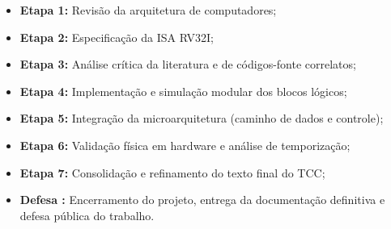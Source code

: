 \begin{itemize}
    \item \textbf{Etapa 1:} Revisão da arquitetura de computadores;
    \item \textbf{Etapa 2:} Especificação da ISA RV32I;
    \item \textbf{Etapa 3:} Análise crítica da literatura e de códigos-fonte correlatos;
    \item \textbf{Etapa 4:} Implementação e simulação modular dos blocos lógicos;
    \item \textbf{Etapa 5:} Integração da microarquitetura (caminho de dados e controle);
    \item \textbf{Etapa 6:} Validação física em hardware e análise de temporização;
    \item \textbf{Etapa 7:} Consolidação e refinamento do texto final do TCC;
    \item \textbf{Defesa :} Encerramento do projeto, entrega da documentação definitiva e defesa pública do trabalho.
\end{itemize}
